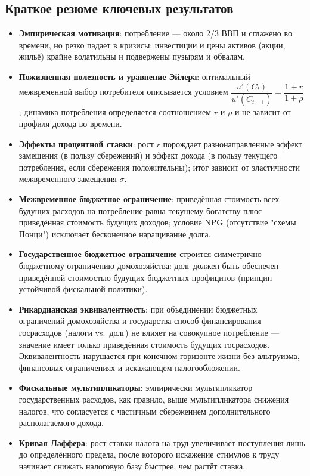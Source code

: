 \documentclass[10pt,a4paper]{article}
\begin{document}
\subsection{Краткое резюме ключевых результатов}
 
\begin{itemize}
\item \textbf{Эмпирическая мотивация}: потребление — около 2/3 ВВП и сглажено во времени, но резко падает в кризисы; инвестиции и цены активов (акции, жильё) крайне волатильны и подвержены пузырям и обвалам.
\item \textbf{Пожизненная полезность и уравнение Эйлера}: оптимальный межвременной выбор потребителя описывается условием $\dfrac{u'(C_t)}{u'(C_{t+1})} = \dfrac{1+r}{1+\rho}$; динамика потребления определяется соотношением $r$ и $\rho$ и не зависит от профиля дохода во времени.
\item \textbf{Эффекты процентной ставки}: рост $r$ порождает разнонаправленные эффект замещения (в пользу сбережений) и эффект дохода (в пользу текущего потребления, если сбережения положительны); итог зависит от эластичности межвременного замещения $\sigma$.
\item \textbf{Межвременное бюджетное ограничение}: приведённая стоимость всех будущих расходов на потребление равна текущему богатству плюс приведённая стоимость будущих доходов; условие NPG (отсутствие "схемы Понци") исключает бесконечное наращивание долга.
\item \textbf{Государственное бюджетное ограничение} строится симметрично бюджетному ограничению домохозяйства: долг должен быть обеспечен приведённой стоимостью будущих бюджетных профицитов (принцип устойчивой фискальной политики).
\item \textbf{Рикардианская эквивалентность}: при объединении бюджетных ограничений домохозяйства и государства способ финансирования госрасходов (налоги vs.\ долг) не влияет на совокупное потребление — значение имеет только приведённая стоимость будущих госрасходов. Эквивалентность нарушается при конечном горизонте жизни без альтруизма, финансовых ограничениях и искажающем налогообложении.
\item \textbf{Фискальные мультипликаторы}: эмпирически мультипликатор государственных расходов, как правило, выше мультипликатора снижения налогов, что согласуется с частичным сбережением дополнительного располагаемого дохода.
\item \textbf{Кривая Лаффера}: рост ставки налога на труд увеличивает поступления лишь до определённого предела, после которого искажение стимулов к труду начинает снижать налоговую базу быстрее, чем растёт ставка.
\end{itemize}
\end{document}
